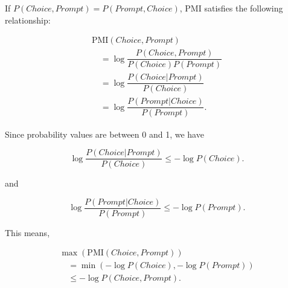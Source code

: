 If {\small $P(Choice,Prompt) = P(Prompt,Choice)$}, PMI satisfies the following relationship:

\begin{small}
\begin{equation} 
\begin{array}{l}
\mbox{PMI}(Choice, Prompt) \\[5pt]
\quad = \log \dfrac{P(Choice, Prompt)}{P(Choice)P(Prompt)} \\[10pt]
\quad = \log \dfrac{P(Choice|Prompt)}{P(Choice)} \\[10pt]
\quad = \log \dfrac{P(Prompt|Choice)}{P(Prompt)}.  
\end{array}
\end{equation}
\end{small}
Since probability values are between 0 and 1, we have
\begin{small}
\begin{equation}
\label{eq:ieq_1}
\log \frac{P(Choice|Prompt)}{P(Choice)} \le -\log P(Choice).
\end{equation}
\end{small}
and 
\begin{small}
\begin{equation}
\label{eq:ieq_2}
\log \frac{P(Prompt|Choice)}{P(Prompt)} \le -\log P(Prompt).
\end{equation}
\end{small}
This means,
\begin{small}
\[
\begin{array}{l}
\max(\mbox{PMI}(Choice, Prompt)) \\[5pt]
\quad = \min(-\log P(Choice), -\log P(Prompt)) \\[5pt]
\quad \le - \log P(Choice, Prompt).
\end{array}
\]
\end{small}




